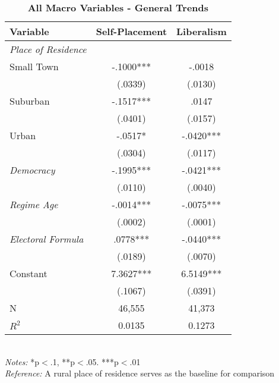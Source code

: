 \documentclass[12pt, titlepage]{article}
\newcommand\e{\emph}
\newcommand\tb{\textbf}
\begin{document}
\begin{table}[h!]
	\centering
	\caption{\tb{All Macro Variables - General Trends}}
	\begin{tabulary}{\linewidth}{l c c}
		\\
		\hline
		\tb{Variable}&\tb{Self-Placement}&\tb{Liberalism} \\
		\hline
		\e{Place of Residence} & & \\
		Small Town &-.1000***&-.0018 \\
		&(.0339)&(.0130) \\
		Suburban& -.1517***& .0147 \\
		&(.0401)& (.0157) \\
		Urban&-.0517* & -.0420*** \\
		&(.0304) & (.0117) \\
		\e{Democracy}& -.1995*** & -.0421***\\
		&(.0110) & (.0040)\\
		\e{Regime Age} & -.0014*** &  -.0075***\\
		&(.0002) & (.0001)\\
		\e{Electoral Formula}&.0778*** & -.0440***\\
		&(.0189) & (.0070) \\
		\hline
		Constant& 7.3627*** & 6.5149*** \\
		&(.1067) & (.0391)\\
		N&46,555 & 41,373 \\
		$R^2$&0.0135& 0.1273 \\
		\hline
	\end{tabulary}
	\\
	\e{Notes:} *p$<$.1, **p$<$.05. ***p$<$.01 \\
	\e{Reference:} A rural place of residence serves as the baseline for comparison
	\label{table15}
\end{table}
\end{document}
